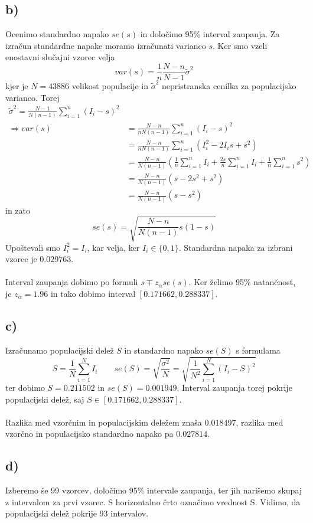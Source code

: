 \documentclass[A4paper, 11pt]{article}
\begin{document}
\subsection*{b)}
Ocenimo standardno napako $se(s)$ in določimo 95\% interval zaupanja. Za izračun standardne napake moramo izračunati varianco $s$. Ker smo vzeli enostavni slučajni vzorec velja
\[ var(s) = \frac{1}{n} \frac{N - n}{N - 1} \tilde{\sigma}^2 \]
kjer je $N=43886$ velikost populacije in $\tilde{\sigma}^2$ nepristranska cenilka za populacijsko varianco. Torej
\[ 
\begin{split}
\tilde{\sigma}^2 = \frac{N - 1}{N (n - 1)} \sum_{i=1}^{n} (I_i - s)^2 \\
\Rightarrow var(s) & = \frac{N - n}{n N (n - 1)} \sum_{i=1}^{n} (I_i - s)^2 \\
		         & = \frac{N - n}{n N (n - 1)} \sum_{i=1}^{n} (I_i^2 - 2 I_i s + s^2) \\
		         & = \frac{N - n}{N (n - 1)} \left ( \frac{1}{n} \sum_{i=1}^{n} I_i +  \frac{2 s}{n} \sum_{i=1}^{n} I_i + \frac{1}{n} \sum_{i=1}^{n} s^2 \right ) \\
		         & = \frac{N - n}{N (n - 1)} (s - 2 s^2 + s^2) \\
		         & = \frac{N - n}{N (n - 1)} (s - s^2)
\end{split}
\]
in zato
\[ se(s) = \sqrt{ \frac{N - n}{N (n - 1)} s (1 - s)} \]
Upoštevali smo $I_i ^2 = I_i$, kar velja, ker $I_i \in \{0,1\}$. Standardna napaka za izbrani vzorec je $0.029763$. \\
\\
Interval zaupanja dobimo po formuli $s \mp z_\alpha se(s)$. Ker želimo 95\% natančnost, je $z_\alpha = 1.96$ in tako dobimo interval $[0.171662, 0.288337]$.

\subsection*{c)}
Izračunamo populacijski delež $S$ in standardno napako $se(S)$ s formulama
\[ S = \frac{1}{N} \sum_{i=1}^{N} I_i  \qquad se(S) = \sqrt{\frac{\sigma^2}{N}} =  \sqrt{\frac{1}{N^2} \sum_{i=1}^{N} (I_i - S)^2} \]
ter dobimo $S=0.211502$ in $se(S)= 0.001949$. Interval zaupanja torej pokrije populacijski delež, saj $S \in [0.171662, 0.288337]$. \\
\\
Razlika med vzorčnim in populacijskim deležem znaša $0.018497$, razlika med vzorčno in populacijsko standardno napako pa $0.027814$.

\subsection*{d)}
Izberemo še 99 vzorcev, določimo 95\% intervale zaupanja, ter jih narišemo skupaj z intervalom za prvi vzorec. S horizontalno črto označimo vrednost S. Vidimo, da populacijski delež pokrije 93 intervalov.
\end{document}
